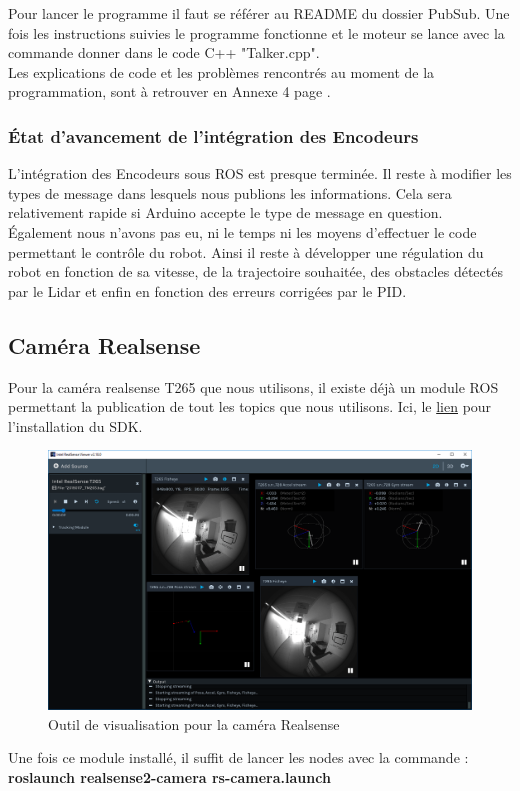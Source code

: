 \documentclass[french]{rapportENSTAB}
\begin{document}
Pour lancer le programme il faut se référer au README du dossier PubSub. Une fois les instructions suivies le programme fonctionne et le moteur se lance avec la commande donner dans le code C++ "Talker.cpp".\\

Les explications de code et les problèmes rencontrés au moment de la programmation, sont à retrouver en Annexe 4 page \pageref{annexe4}.\\


\subsubsection{État d'avancement de l'intégration des Encodeurs}
L'intégration des Encodeurs sous ROS est presque terminée. Il reste à modifier les types de message dans lesquels nous publions les informations. Cela sera relativement rapide si Arduino accepte le type de message en question.\\

Également nous n'avons pas eu, ni le temps ni les moyens d'effectuer le code permettant le contrôle du robot. Ainsi il reste à développer une régulation du robot en fonction de sa vitesse, de la trajectoire souhaitée, des obstacles détectés par le Lidar et enfin en fonction des erreurs corrigées par le PID.

\subsection{Caméra Realsense}
Pour la caméra realsense T265 que nous utilisons, il existe déjà un module ROS permettant la publication de tout les topics que nous utilisons. Ici, le  \href{https://github.com/IntelRealSense/realsense-ros}{lien} pour l’installation du SDK. \\


\begin{figure}[H]
    \centering
    \includegraphics[scale=0.25]{images/robot/realsense-viewer.png}
    \caption{Outil de visualisation pour la caméra Realsense}
    \label{fig:archi elec}
\end{figure}
Une fois ce module installé, il suffit de lancer les nodes avec la commande : \\
\textbf{roslaunch realsense2-camera rs-camera.launch} \\
\end{document}
